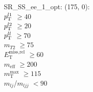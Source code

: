 SR\_SS\_ee\_1\_opt: (175, 0): \\
$p_{\text{T}}^{l1}$ $\geq 40$ \\
$p_{\text{T}}^{l2}$ $\geq 20$ \\
$p_{\text{T}}^{ll}$ $\geq 70$ \\
$m_{T2}$ $\geq 75$ \\
$E_{\text{T}}^{\text{miss,rel}}$ $\geq 60$ \\
$m_{\text{eff}}$ $\geq 200$ \\
$m_{\text{T}}^{\text{max}}$ $\geq 115$ \\
$m_{lj}$/$m_{ljj}$ $<90$ \\
